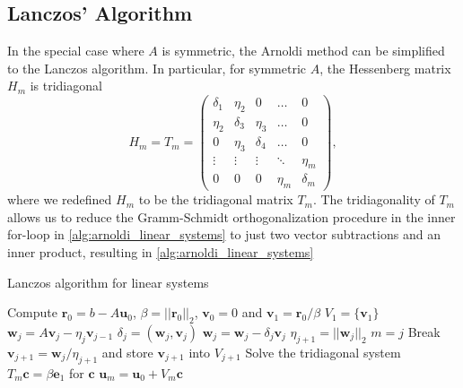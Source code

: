 \subsection{Lanczos' Algorithm}
In the special case where $A$ is symmetric, the Arnoldi method can be simplified to the Lanczos algorithm. In particular, for symmetric $A$, the Hessenberg matrix $H_m$ is tridiagonal
\begin{equation}
  H_m = T_m =
  \begin{pmatrix}
    \delta_1 & \eta_2   & 0        & \dots  & 0        \\
    \eta_2   & \delta_3 & \eta_3   & \dots  & 0        \\
    0        & \eta_3   & \delta_4 & \dots  & 0        \\
    \vdots   & \vdots   & \vdots   & \ddots & \eta_m   \\
    0        & 0        & 0        & \eta_m & \delta_m
  \end{pmatrix},
  \label{eq:lanczos_tridiagonal}
\end{equation}
where we redefined $H_m$ to be the tridiagonal matrix $T_m$. The tridiagonality of $T_m$ allows us to reduce the Gramm-Schmidt orthogonalization procedure in the inner for-loop in \cref{alg:arnoldi_linear_systems} to just two vector subtractions and an inner product, resulting in \cref{alg:arnoldi_linear_systems}
\begin{algorithm}
  \caption{Lanczos algorithm for linear systems \cite[Algorithm 6.16]{iter_method_saad}}
  \begin{algorithmic}
    \State Compute $\mathbf{r}_0 = b - A\mathbf{u}_0$, $\beta = ||\mathbf{r}_0||_2$, $\mathbf{v}_0 = 0$ and $\mathbf{v}_1 = \mathbf{r}_0 / \beta$
    \State $V_{1} = \{\mathbf{v}_1\}$
    \State $\mathbf{w}_j = A\mathbf{v}_j - \eta_j \mathbf{v}_{j-1}$
    \State $\delta_j = (\mathbf{w}_j, \mathbf{v}_j)$
    \State $\mathbf{w}_j = \mathbf{w}_j - \delta_j \mathbf{v}_j$
    \State $\eta_{j+1} = ||\mathbf{w}_j||_2$
    \State $m = j$
    \State Break
    \EndIf
    \State $\mathbf{v}_{j+1} = \mathbf{w}_j / \eta_{j+1}$ and store $\mathbf{v}_{j+1}$ into $V_{j+1}$
    \EndFor
    \State Solve the tridiagonal system $T_m \mathbf{c} = \beta \mathbf{e}_1$ for $\mathbf{c}$
    \State $\mathbf{u}_m = \mathbf{u}_0 + V_m \mathbf{c}$
  \end{algorithmic}
  \label{alg:lanczos_linear_systems}
\end{algorithm}

